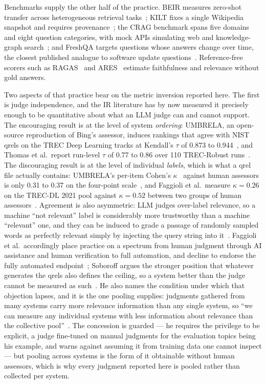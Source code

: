 \documentclass[acmsmall,review,anonymous,screen]{acmart}
\begin{document}
Benchmarks supply the other half of the practice. BEIR measures zero-shot
transfer across heterogeneous retrieval tasks~\cite{thakur2021beir}; KILT fixes a
single Wikipedia snapshot and requires provenance~\cite{petroni2021kilt}; the
CRAG benchmark spans five domains and eight question categories, with mock APIs
simulating web and knowledge-graph search~\cite{yang2024}; and FreshQA targets
questions whose answers change over time, the closest published analogue to
software update questions~\cite{vu2024freshllms}. Reference-free scorers such as
RAGAS~\cite{es2024ragas} and ARES~\cite{saadfalcon2024ares} estimate
faithfulness and relevance without gold answers.

Two aspects of that practice bear on the metric inversion reported here. The
first is judge independence, and the IR literature has by now measured it
precisely enough to be quantitative about what an LLM judge can and cannot
support. The encouraging result is at the level of system \emph{ordering}:
UMBRELA, an open-source reproduction of Bing's assessor, induces rankings that
agree with NIST qrels on the TREC Deep Learning tracks at Kendall's $\tau$ of
0.873 to 0.944~\cite{upadhyay2024umbrela}, and Thomas et al.\ report run-level
$\tau$ of 0.77 to 0.86 over 110 TREC-Robust runs~\cite{thomas2024preferences}.
The discouraging result is at the level of individual \emph{labels}, which is
what a qrel file actually contains: UMBRELA's per-item Cohen's
$\kappa$~\cite{cohen1960coefficient} against
human assessors is only 0.31 to 0.37 on the four-point
scale~\cite{upadhyay2024umbrela}, and Faggioli et al.\ measure $\kappa=0.26$ on
the TREC-DL 2021 pool against $\kappa=0.52$ between two groups of human
assessors~\cite{faggioli2023perspectives}. Agreement is also asymmetric:
LLM judges over-label relevance, so a machine ``not relevant'' label is
considerably more trustworthy than a machine ``relevant'' one, and they can be
induced to grade a passage of randomly sampled words as perfectly relevant
simply by injecting the query string into
it~\cite{alaofi2024fooled}. Faggioli et al.\ accordingly place practice on a
spectrum from human judgment through AI assistance and human verification to
full automation, and decline to endorse the fully automated
endpoint~\cite{faggioli2023perspectives}; Soboroff argues the stronger position
that whatever generates the qrels also defines the ceiling, so a system better
than the judge cannot be measured as
such~\cite{soboroff2025dontuse}. He also names the condition under which that
objection lapses, and it is the one pooling supplies: judgments gathered from
many systems carry more relevance information than any single system, so ``we
can measure any individual systems with less information about relevance than
the collective pool''~\cite{soboroff2025dontuse}. The concession is guarded ---
he requires the privilege to be explicit, a judge fine-tuned on manual
judgments for the evaluation topics being his example, and warns against
assuming it from training data one cannot inspect --- but pooling across
systems is the form of it obtainable without human assessors, which is why
every judgment reported here is pooled rather than collected per system.
\end{document}
